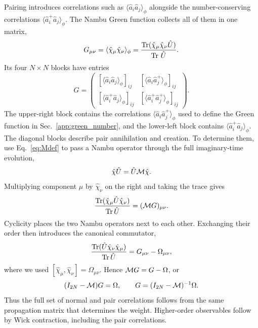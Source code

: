Pairing introduces correlations such as $\langle\hat a_i\hat a_j\rangle_\phi$ alongside the number-conserving correlations $\langle\hat a_i^+\hat a_j\rangle_\phi$. The Nambu Green function collects all of them in one matrix,
\begin{equation}
    G_{\mu\nu}
    =\langle\hat\chi_\mu\hat\chi_\nu\rangle_\phi
    =\frac{\operatorname{Tr}(\hat\chi_\mu\hat\chi_\nu\hat U)}{\operatorname{Tr}\,\hat U}.
    \label{eq:Gdef}
\end{equation}
Its four $N\times N$ blocks have entries
\begin{equation}
    G=
    \begin{pmatrix}
        [\langle\hat a_i\hat a_j\rangle_\phi]_{ij}&[\langle\hat a_i\hat a_j^+\rangle_\phi]_{ij}\\
        [\langle\hat a_i^+\hat a_j\rangle_\phi]_{ij}&[\langle\hat a_i^+\hat a_j^+\rangle_\phi]_{ij}
    \end{pmatrix}.
\end{equation}
The upper-right block contains the correlations $\langle\hat a_i\hat a_j^+\rangle_\phi$ used to define the Green function in Sec.~\ref{app:green_number}, and the lower-left block contains $\langle\hat a_i^+\hat a_j\rangle_\phi$. The diagonal blocks describe pair annihilation and creation. To determine them, use Eq.~\eqref{eq:Mdef} to pass a Nambu operator through the full imaginary-time evolution,
\begin{equation}
    \hat\chi\hat U=\hat U\mathcal{M}\hat\chi.
    \label{eq:chiUappendix}
\end{equation}
Multiplying component $\mu$ by $\hat\chi_\nu$ on the right and taking the trace gives
\begin{equation}
    \frac{\operatorname{Tr}(\hat\chi_\mu\hat U\hat\chi_\nu)}{\operatorname{Tr}\hat U}
    =(\mathcal{M} G)_{\mu\nu}.
\end{equation}
Cyclicity places the two Nambu operators next to each other. Exchanging their order then introduces the canonical commutator,
\begin{equation}
    \frac{\operatorname{Tr}(\hat U\hat\chi_\nu\hat\chi_\mu)}{\operatorname{Tr}\hat U}
    =G_{\mu\nu}-\Omega_{\mu\nu},
\end{equation}
where we used $[\hat\chi_\mu,\hat\chi_\nu]=\Omega_{\mu\nu}$. Hence $\mathcal{M} G=G-\Omega$, or
\begin{equation}
    (I_{2N}-\mathcal{M})G=\Omega,
    \qquad
    G=(I_{2N}-\mathcal{M})^{-1}\Omega.
    \label{eq:Gformula}
\end{equation}
Thus the full set of normal and pair correlations follows from the same propagation matrix that determines the weight. Higher-order observables follow by Wick contraction, including the pair correlations.

